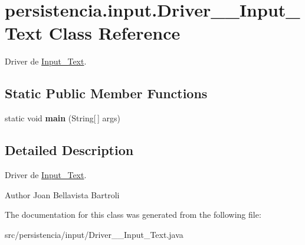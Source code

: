 \hypertarget{classpersistencia_1_1input_1_1Driver____Input__Text}{}\section{persistencia.\+input.\+Driver\+\_\+\+\_\+\+Input\+\_\+\+Text Class Reference}
\label{classpersistencia_1_1input_1_1Driver____Input__Text}


Driver de \hyperlink{classpersistencia_1_1input_1_1Input__Text}{Input\+\_\+\+Text}.  


\subsection*{Static Public Member Functions}
\begin{DoxyCompactItemize}
\item 
\mbox{\label{classpersistencia_1_1input_1_1Driver____Input__Text_abd1883a5cb70c0120dd4d34c7ab0e74f}} 
static void {\bfseries main} (String\mbox{[}$\,$\mbox{]} args)
\end{DoxyCompactItemize}


\subsection{Detailed Description}
Driver de \hyperlink{classpersistencia_1_1input_1_1Input__Text}{Input\+\_\+\+Text}. 

\begin{DoxyAuthor}{Author}
Joan Bellavista Bartroli 
\end{DoxyAuthor}


The documentation for this class was generated from the following file\+:\begin{DoxyCompactItemize}
\item 
src/persistencia/input/Driver\+\_\+\+\_\+\+Input\+\_\+\+Text.\+java\end{DoxyCompactItemize}
